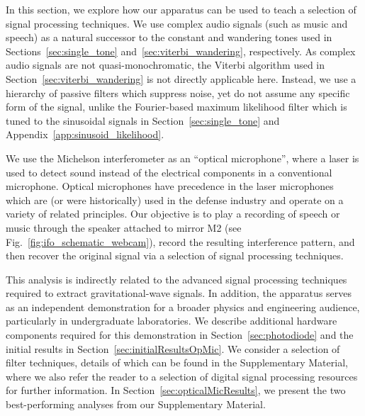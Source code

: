\documentclass[paper-main.tex]{subfiles}
\begin{document}
In this section, we explore how our apparatus can be used to teach a selection of signal processing techniques. 
We use complex audio signals (such as music and speech) as a natural successor to the constant and wandering tones used in Sections~\ref{sec:single_tone} and~\ref{sec:viterbi_wandering}, respectively.
As complex audio signals are not quasi-monochromatic, the Viterbi algorithm used in Section~\ref{sec:viterbi_wandering} is not directly applicable here. 
Instead, we use a hierarchy of passive filters which suppress noise, yet do not assume any specific form of the signal, unlike the Fourier-based maximum likelihood filter which is tuned to the sinusoidal signals in Section~\ref{sec:single_tone} and Appendix~\ref{app:sinusoid_likelihood}.

We use the Michelson interferometer as an ``optical microphone'', where a laser is used to detect sound instead of the electrical components in a conventional microphone.
Optical microphones have precedence in the laser microphones~\cite{laser_microphone} which are (or were historically) used in the defense industry and operate on a variety of related principles. 
Our objective is to play a recording of speech or music through the speaker attached to mirror M2 (see Fig.~\ref{fig:ifo_schematic_webcam}), record the resulting interference pattern, and then recover the original signal via a selection of signal processing techniques. 


This analysis is indirectly related to the advanced signal processing techniques required to extract gravitational-wave signals. 
In addition, the apparatus serves as an independent demonstration for a broader physics and engineering audience, particularly in undergraduate laboratories. 
We describe additional hardware components required for this demonstration in Section~\ref{sec:photodiode} and the initial results in Section~\ref{sec:initialResultsOpMic}. 
We consider a selection of filter techniques, details of which can be found in the Supplementary Material, where we also refer the reader to a selection of digital signal processing resources for further information. 
In Section~\ref{sec:opticalMicResults}, we present the two best-performing analyses from our Supplementary Material. 
\end{document}
